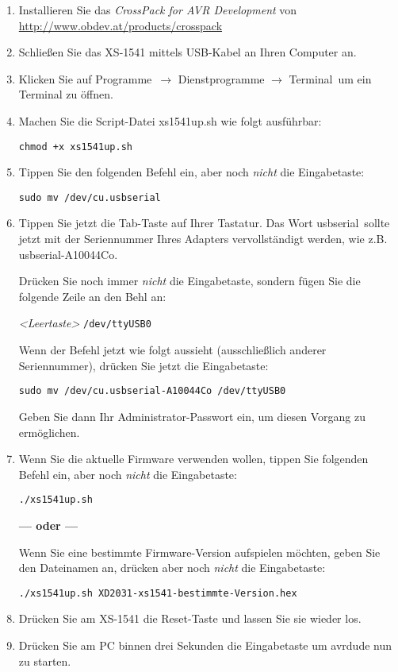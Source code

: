 \documentclass[10pt,a4paper]{scrartcl}		%
\begin{document}
\begin{enumerate}
\item Installieren Sie das \textit{CrossPack for 
AVR\textsuperscript{\textregistered} Development} von 
\\\url{http://www.obdev.at/products/crosspack}
\item Schließen Sie das XS-1541 mittels USB-Kabel an Ihren Computer an.
\item Klicken Sie auf \glqq Programme\grqq\ $\to$ \glqq Dienstprogramme\grqq
$\to$ \glqq Terminal\grqq\ um ein Terminal zu öffnen.
\item Machen Sie die Script-Datei xs1541up.sh wie folgt ausführbar:

\texttt{chmod +x xs1541up.sh}
\item Tippen Sie den folgenden Befehl ein, aber noch \textit{nicht} die
Eingabetaste:

\texttt{sudo mv /dev/cu.usbserial}

\item Tippen Sie jetzt die Tab-Taste auf Ihrer Tastatur. Das Wort
\glqq usbserial\grqq\ sollte jetzt mit der Seriennummer Ihres Adapters
vervollständigt werden, wie z.B. usbserial-A10044Co.

Drücken Sie noch immer \textit{nicht} die Eingabetaste, sondern fügen
Sie die folgende Zeile an den Behl an:

\textit{<Leertaste>} \texttt{/dev/ttyUSB0}

Wenn der Befehl jetzt wie folgt aussieht (ausschließlich anderer
Seriennummer), drücken Sie jetzt die Eingabetaste:

\texttt{sudo mv /dev/cu.usbserial-A10044Co /dev/ttyUSB0}

Geben Sie dann Ihr Administrator-Passwort ein, um diesen Vorgang
zu ermöglichen.
\item Wenn Sie die aktuelle Firmware verwenden wollen, tippen Sie
	folgenden Befehl ein, aber noch \textit{nicht} die 
	Eingabetaste:

	\texttt{./xs1541up.sh}

	\textbf{--- oder ---}

	Wenn Sie eine bestimmte Firmware-Version aufspielen möchten, geben
	Sie den Dateinamen an, drücken aber noch \textit{nicht}
	die Eingabetaste:

	\texttt{./xs1541up.sh XD2031-xs1541-bestimmte-Version.hex}

\item Drücken Sie am XS-1541 die Reset-Taste und lassen Sie sie wieder los.
\item Drücken Sie am PC binnen drei Sekunden die Eingabetaste um
	avrdude nun zu starten.
\end{enumerate}
\end{document}

